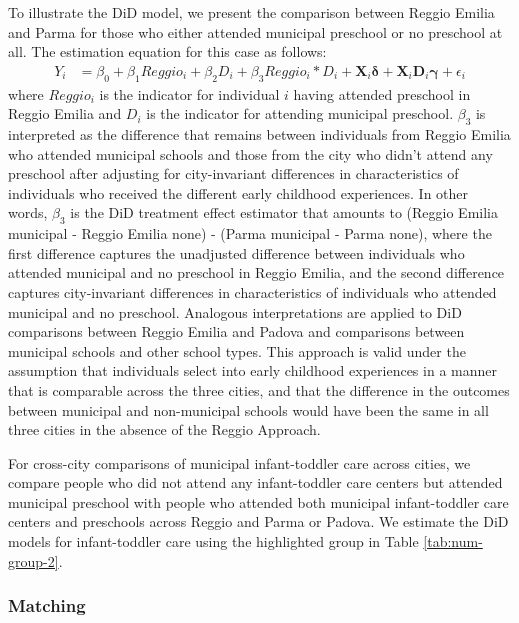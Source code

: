 To illustrate the DiD model, we present the comparison between Reggio Emilia and Parma for those who either attended municipal preschool or no preschool at all. The estimation equation for this case as follows:
\begin{eqnarray}  \label{eq:specific2}
Y_i & = \beta_0 + \beta_1 Reggio_i + \beta_2 D_i + \beta_3 Reggio_i * D_i + \bm{X}_i \bm{\delta} + \bm{X}_i \bm{D}_i \bm{\gamma} + \epsilon_i
\end{eqnarray}
\noindent where $Reggio_i$ is the indicator for individual $i$ having attended preschool in Reggio Emilia and $D_i$ is the indicator for attending municipal preschool. $\beta_3$ is interpreted as the difference that remains between individuals from Reggio Emilia who attended municipal schools and those from the city who didn't attend any preschool after adjusting for city-invariant differences in characteristics of individuals who received the different early childhood experiences. In other words, $\beta_3$ is the DiD treatment effect estimator that amounts to (Reggio Emilia municipal - Reggio Emilia none) - (Parma municipal - Parma none), where the first difference captures the unadjusted difference between individuals who attended municipal and no preschool in Reggio Emilia, and the second difference captures city-invariant differences in characteristics of individuals who attended municipal and no preschool. Analogous interpretations are applied to DiD comparisons between Reggio Emilia and Padova and comparisons between municipal schools and other school types. This approach is valid under the assumption that individuals select into early childhood experiences in a manner that is comparable across the three cities, and that the difference in the outcomes between municipal and non-municipal schools would have been the same in all three cities in the absence of the Reggio Approach.

For cross-city comparisons of municipal infant-toddler care across cities, we compare people who did not attend any infant-toddler care centers but attended municipal preschool with people who attended both municipal infant-toddler care centers and preschools across Reggio and Parma or Padova. We estimate the DiD models for infant-toddler care using the highlighted group in Table \ref{tab:num-group-2}.

\subsubsection{Matching}


